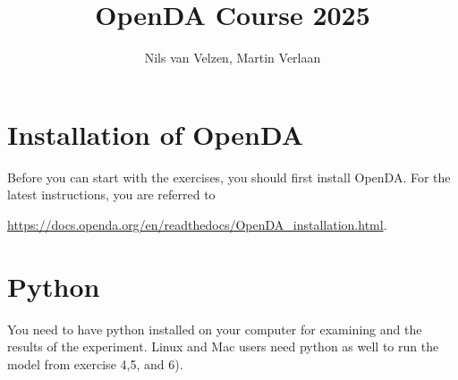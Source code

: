 \documentclass[a4paper,10pt]{article}
\title{OpenDA Course 2025}
\author{Nils van Velzen, Martin Verlaan}
\begin{document}


\maketitle


\tableofcontents

\section*{Installation of OpenDA}
Before you can start with the exercises, you should first install OpenDA. For the
latest instructions, you are referred to

\url{https://docs.openda.org/en/readthedocs/OpenDA_installation.html}.

\newpage
\section*{Python}
You need to have python installed on your computer for examining and the results of the experiment.
Linux and Mac users need python as well to run the model from exercise 4,5, and 6).
\end{document}
